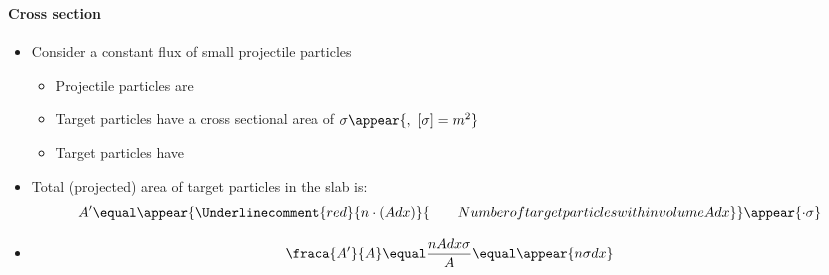 \begin{frame}
\frametitle{\texorpdfstring{\culine[\sectiontitleulinecolor]{\sectiontitle}}{\sectiontitle} }
\framesubtitle{Cross section}%

%
\begin{itemize}
	\item Consider a constant flux of small projectile particles  
\begin{itemize}
	\item Projectile particles are 
\item Target particles have a cross sectional area of $\sigma\appear{,~[\sigma]=m^{2}}$
\item Target particles have  
\end{itemize}

\item Total (projected) area of target particles in the slab is:
\[
A^{\prime}  \equal \appear{\Underlinecomment{red}{n \cdot(A d x)}{\qquad Number of target particles within volume Adx}} \appear{\cdot \sigma}
\]

\item {}  
\[
\fraca{A^{\prime}}{A}  \equal \frac{n A d x \sigma}{A} \equal \appear{n \sigma d x}
\]
\end{itemize}


\endofslide 
\end{frame}

